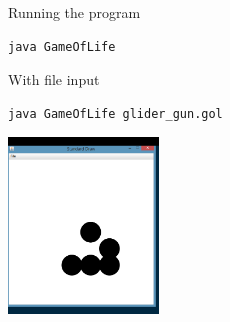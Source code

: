 Running the program

\begin{Verbatim}
java GameOfLife
\end{Verbatim}

With file input

\begin{Verbatim}
java GameOfLife glider_gun.gol
\end{Verbatim}

\includegraphics[width=0.3\textwidth]{gol-example}